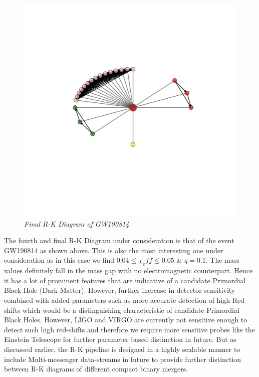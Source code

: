     \begin{figure}[H]
        \centering
        \includegraphics[width=1.0\linewidth]{images/GW190814_RK_Diagram.png}
        \caption{\textit{Final R-K Diagram of GW190814}}
        \label{fig:LIGO14_PlaceHolder_fig}
    \end{figure}

The fourth and final R-K Diagram under consideration is that of the event GW190814 as shown above. This is also the most interesting one under consideration as in this case we find $0.04 \le \chi_eff \le 0.05$ \&  $q = 0.1$. The mass values  definitely fall in the mass gap with no electromagnetic counterpart. Hence it has a lot of prominent features that are indicative of a candidate Primordial Black Hole (Dark Matter). However, further increase in detector sensitivity combined with added parameters such as more accurate detection of high Red-shifts which would be a distinguishing characteristic of candidate Primordial Black Holes. However, LIGO and VIRGO are currently not sensitive enough to detect such high red-shifts and therefore we require more sensitive probes like the Einstein Telescope for further parameter based distinction in future. But as discussed earlier, the R-K pipeline is designed in a highly scalable manner to include Multi-messenger data-streams in future to provide further distinction between R-K diagrams of different compact binary mergers.  


